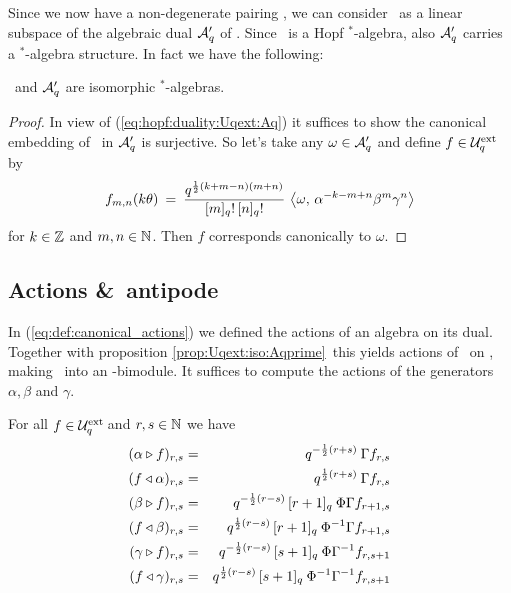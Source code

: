 Since we now have a non-degenerate pairing \UqextAq, we can consider
\Uqext\ as a linear subspace of the algebraic dual ${\mathcal A}_q'$ of \Aq\@.
Since \Aq\ is a Hopf $^*$-algebra, also ${\mathcal A}_q'$ carries a
$^*$-algebra structure. In fact we have the following:

\begin{prop} \label{prop:Uqext:iso:Aqprime}
  \hspace{3pt} \Uqext\ and\/ ${\mathcal A}_q'$ are isomorphic $^*$-algebras.
\end{prop}
\begin{proof}
  In view of (\ref{eq:hopf:duality:Uqext:Aq}) it suffices
  to show the canonical embedding of \Uqext\ in ${\mathcal A}_q'$ is
  surjective. So let's take any $\omega\in {\mathcal A}_q'$ and define $f\in {\mathcal U}_q^{\rm ext}\!$ by
  $$ f_{m,n}(k\theta) \:=\: \frac{q^{\frac{1}{2}(k+m-n)(m+n)}}{\qfac{m}\, \qfac{n}}
                       \, \pairM{\omega}{\alpha^{-k-m+n} \beta^m \gamma^n} $$
  for $k\in \mathbb{Z}$ and $m,n \in \mathbb{N}$.
  Then $f$ corresponds canonically to $\omega$.
\end{proof}



\subsection{Actions \&\ antipode}

In (\ref{eq:def:canonical_actions}) we defined the actions of an algebra on its dual.
Together with proposition \ref{prop:Uqext:iso:Aqprime}\ this yields
actions of \Aq\ on \Uqext, making \Uqext\ into an \Aq-bimodule.
It suffices to compute the actions of the generators $\alpha, \beta$ and $\gamma$.


\begin{prop} \label{prop:actions_on_Uqext}
For all\/ $f \in {\mathcal U}_q^{\rm ext}\!$ and\/ $r,s \in \mathbb{N}$ we have
\begin{eqnarray*}
  (\alpha \triangleright f)_{r,s} &=& q^{-\frac{1}{2}(r+s)} \: \Gamma f_{r,s}
\\
  (f \triangleleft \alpha)_{r,s} &=& q^{\frac{1}{2}(r+s)}  \: \Gamma f_{r,s}
\\
  (\beta \triangleright f)_{r,s}  &=& q^{-\frac{1}{2}(r-s)} \,[r+1]_q \: \Phi\Gamma f_{r+1,s}
\\
  (f \triangleleft \beta)_{r,s}  &=& q^{\frac{1}{2}(r-s)}  \,[r+1]_q \: \Phi^{-1}\Gamma f_{r+1,s}
\\
  (\gamma \triangleright f)_{r,s} &=& q^{-\frac{1}{2}(r-s)} \,[s+1]_q \: \Phi\Gamma^{-1} f_{r,s+1}
\\
  (f \triangleleft \gamma)_{r,s} &=& q^{\frac{1}{2}(r-s)}  \,[s+1]_q \: \Phi^{-1}\Gamma^{-1} f_{r,s+1}
\end{eqnarray*}
\end{prop}

